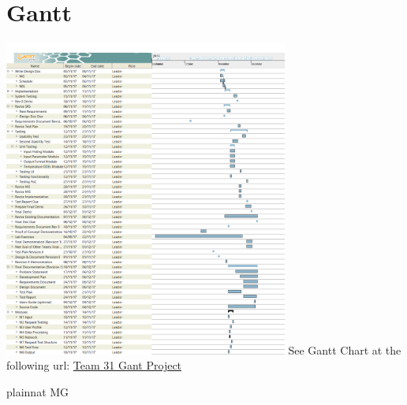 \documentclass[12pt, titlepage]{article}
\begin{document}
\section{Gantt}
\centering
\includegraphics[width=0.7\textwidth]{gantt.png}
\newline
See Gantt Chart at the following url: \href{https://gitlab.cas.mcmaster.ca/myersd1/3xa3-team31/blob/master/ProjectSchedule/Team\%2031\%20Gantt\%20Project.pdf}{Team 31 Gant Project}

 {plainnat}
 {MG}
\end{document}
